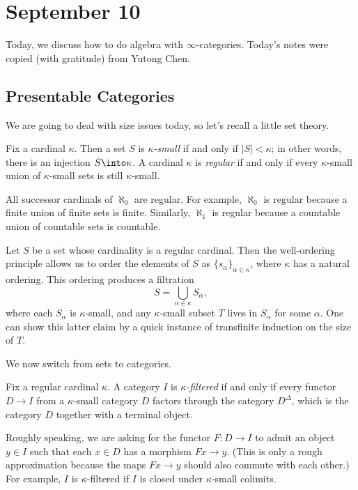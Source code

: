 \documentclass[../notes.tex]{subfiles}
\begin{document}
\section{September 10}
Today, we discuss how to do algebra with $\infty$-categories. Today's notes were copied (with gratitude) from Yutong Chen.

\subsection{Presentable Categories}
We are going to deal with size issues today, so let's recall a little set theory.
\begin{definition}[regular]
	Fix a cardinal $\kappa$. Then a set $S$ is \textit{$\kappa$-small} if and only if $\left|S\right|<\kappa$; in other words, there is an injection $S\into\kappa$. A cardinal $\kappa$ is \textit{regular} if and only if every $\kappa$-small union of $\kappa$-small sets is still $\kappa$-small.
\end{definition}
\begin{example}
	All successor cardinals of $\aleph_0$ are regular. For example, $\aleph_0$ is regular because a finite union of finite sets is finite. Similarly, $\aleph_1$ is regular because a countable union of countable sets is countable.
\end{example}
\begin{remark}
	Let $S$ be a set whose cardinality is a regular cardinal. Then the well-ordering principle allows us to order the elements of $S$ as $\{s_\alpha\}_{\alpha\in\kappa}$, where $\kappa$ has a natural ordering. This ordering produces a filtration
	\[S=\bigcup_{\alpha\in\kappa}S_\alpha,\]
	where each $S_\alpha$ is $\kappa$-small, and any $\kappa$-small subset $T$ lives in $S_\alpha$ for some $\alpha$. One can show this latter claim by a quick instance of transfinite induction on the size of $T$.
\end{remark}
We now switch from sets to categories.
\begin{definition}[filtered]
	Fix a regular cardinal $\kappa$. A category $I$ is \textit{$\kappa$-filtered} if and only if every functor $D\to I$ from a $\kappa$-small category $D$ factors through the category $D^\Delta$, which is the category $D$ together with a terminal object.
\end{definition}
\begin{remark}
	Roughly speaking, we are asking for the functor $F\colon D\to I$ to admit an object $y\in I$ such that each $x\in D$ has a morphism $Fx\to y$. (This is only a rough approximation because the maps $Fx\to y$ should also commute with each other.) For example, $I$ is $\kappa$-filtered if $I$ is closed under $\kappa$-small colimits.
\end{remark}
\end{document}
